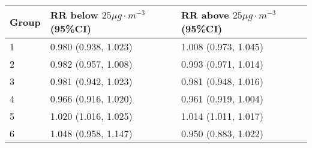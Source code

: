 \begin{tabular}{lll}
  \hline
Group & RR below $25 \mu g \cdot m^{-3}$ (95\%CI) & RR above $25 \mu g \cdot m^{-3}$ (95\%CI) \\ 
  \hline
   1 & 0.980 (0.938, 1.023) & 1.008 (0.973, 1.045) \\ 
     2 & 0.982 (0.957, 1.008) & 0.993 (0.971, 1.014) \\ 
     3 & 0.981 (0.942, 1.023) & 0.981 (0.948, 1.016) \\ 
     4 & 0.966 (0.916, 1.020) & 0.961 (0.919, 1.004) \\ 
     5 & 1.020 (1.016, 1.025) & 1.014 (1.011, 1.017) \\ 
     6 & 1.048 (0.958, 1.147) & 0.950 (0.883, 1.022) \\ 
   \hline
\end{tabular}

